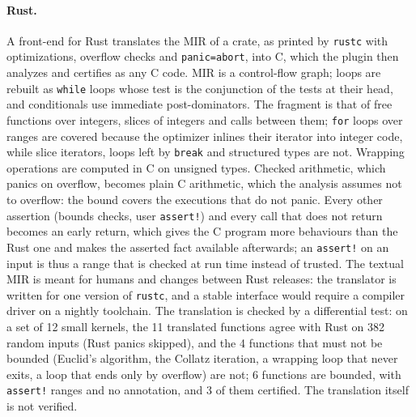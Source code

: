 \documentclass[oneside,english]{amsart}
\numberwithin{equation}{section}
\numberwithin{figure}{section}
\theoremstyle{plain}
\theoremstyle{definition}
\theoremstyle{plain}
\theoremstyle{remark}
\theoremstyle{plain}
\theoremstyle{definition}
\theoremstyle{plain}
\theoremstyle{remark}
\begin{document}
\paragraph{Rust.}
A front-end for Rust translates the MIR of a crate, as printed by \texttt{rustc} with optimizations, overflow checks and \texttt{panic=abort}, into C, which the plugin then analyzes and certifies as any C code. MIR is a control-flow graph; loops are rebuilt as \texttt{while} loops whose test is the conjunction of the tests at their head, and conditionals use immediate post-dominators. The fragment is that of free functions over integers, slices of integers and calls between them; \texttt{for} loops over ranges are covered because the optimizer inlines their iterator into integer code, while slice iterators, loops left by \texttt{break} and structured types are not. Wrapping operations are computed in C on unsigned types. Checked arithmetic, which panics on overflow, becomes plain C arithmetic, which the analysis assumes not to overflow: the bound covers the executions that do not panic. Every other assertion (bounds checks, user \texttt{assert!}) and every call that does not return becomes an early return, which gives the C program more behaviours than the Rust one and makes the asserted fact available afterwards; an \texttt{assert!} on an input is thus a range that is checked at run time instead of trusted. The textual MIR is meant for humans and changes between Rust releases: the translator is written for one version of \texttt{rustc}, and a stable interface would require a compiler driver on a nightly toolchain. The translation is checked by a differential test: on a set of 12 small kernels, the 11 translated functions agree with Rust on 382 random inputs (Rust panics skipped), and the 4 functions that must not be bounded (Euclid's algorithm, the Collatz iteration, a wrapping loop that never exits, a loop that ends only by overflow) are not; 6 functions are bounded, with \texttt{assert!} ranges and no annotation, and 3 of them certified. The translation itself is not verified.
\end{document}
